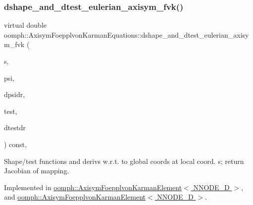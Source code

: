 \subsubsection{\texorpdfstring{dshape\+\_\+and\+\_\+dtest\+\_\+eulerian\+\_\+axisym\+\_\+fvk()}{dshape\_and\_dtest\_eulerian\_axisym\_fvk()}\hspace{0.1cm}{\footnotesize\ttfamily [1/2]}}
{\footnotesize\ttfamily virtual double oomph\+::\+Axisym\+Foepplvon\+Karman\+Equations\+::dshape\+\_\+and\+\_\+dtest\+\_\+eulerian\+\_\+axisym\+\_\+fvk (\begin{DoxyParamCaption}\item[{const \hyperlink{classoomph_1_1Vector}{Vector}$<$ double $>$ \&}]{s,  }\item[{\hyperlink{classoomph_1_1Shape}{Shape} \&}]{psi,  }\item[{\hyperlink{classoomph_1_1DShape}{D\+Shape} \&}]{dpsidr,  }\item[{\hyperlink{classoomph_1_1Shape}{Shape} \&}]{test,  }\item[{\hyperlink{classoomph_1_1DShape}{D\+Shape} \&}]{dtestdr }\end{DoxyParamCaption}) const\hspace{0.3cm}{\ttfamily [protected]}, {}}



Shape/test functions and derivs w.\+r.\+t. to global coords at local coord. s; return Jacobian of mapping. 



Implemented in \hyperlink{classoomph_1_1AxisymFoepplvonKarmanElement_a0eb2dfad7aef696dfeabb51595db46db}{oomph\+::\+Axisym\+Foepplvon\+Karman\+Element$<$ N\+N\+O\+D\+E\+\_\+D $>$}, and \hyperlink{classoomph_1_1AxisymFoepplvonKarmanElement_a0eb2dfad7aef696dfeabb51595db46db}{oomph\+::\+Axisym\+Foepplvon\+Karman\+Element$<$ N\+N\+O\+D\+E\+\_\+D $>$}.

\mbox{\label{classoomph_1_1AxisymFoepplvonKarmanEquations_a838cd424e2666b007113de0a95f5d999}} 
